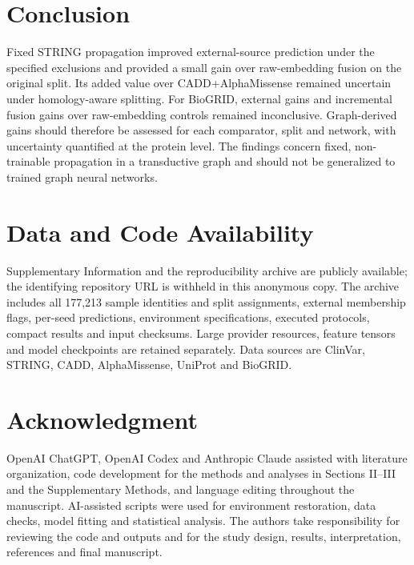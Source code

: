 \documentclass[conference]{IEEEtran}
\begin{document}
\section{Conclusion}
Fixed STRING propagation improved external-source prediction under the specified exclusions and provided a small gain over raw-embedding fusion on the original split. Its added value over CADD+AlphaMissense remained uncertain under homology-aware splitting. For BioGRID, external gains and incremental fusion gains over raw-embedding controls remained inconclusive. Graph-derived gains should therefore be assessed for each comparator, split and network, with uncertainty quantified at the protein level. The findings concern fixed, non-trainable propagation in a transductive graph and should not be generalized to trained graph neural networks.

\section*{Data and Code Availability}

Supplementary Information and the reproducibility archive are publicly available; the identifying repository URL is withheld in this anonymous copy. The archive includes all 177,213 sample identities and split assignments, external membership flags, per-seed predictions, environment specifications, executed protocols, compact results and input checksums. Large provider resources, feature tensors and model checkpoints are retained separately. Data sources are ClinVar, STRING, CADD, AlphaMissense, UniProt and BioGRID.

\section*{Acknowledgment}

OpenAI ChatGPT, OpenAI Codex and Anthropic Claude assisted with literature organization, code development for the methods and analyses in Sections II--III and the Supplementary Methods, and language editing throughout the manuscript. AI-assisted scripts were used for environment restoration, data checks, model fitting and statistical analysis. The authors take responsibility for reviewing the code and outputs and for the study design, results, interpretation, references and final manuscript.
\end{document}
